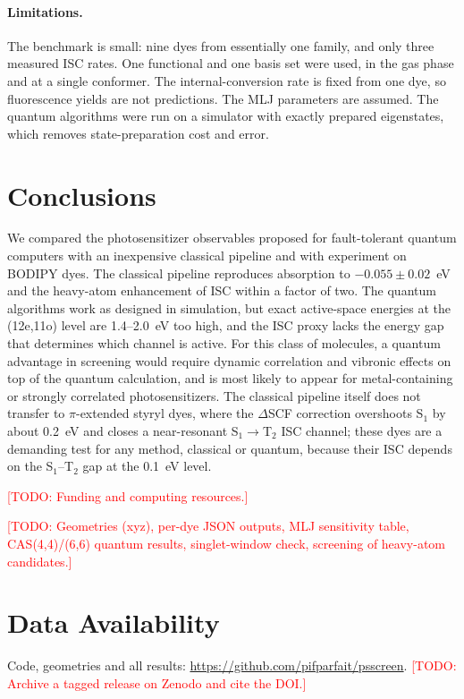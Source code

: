 \documentclass[journal=jpcafh,manuscript=article]{achemso}
\newcommand{\todo}[1]{\textcolor{red}{[TODO: #1]}}
\begin{document}
\paragraph{Limitations.} The benchmark is small: nine dyes from essentially one family, and only
three measured ISC rates. One functional and one basis set were used, in the gas phase and at a
single conformer. The internal-conversion rate is fixed from one dye, so fluorescence yields are not
predictions. The MLJ parameters are assumed. The quantum algorithms were run on a simulator with
exactly prepared eigenstates, which removes state-preparation cost and error.

\section{Conclusions}

We compared the photosensitizer observables proposed for fault-tolerant quantum computers with an
inexpensive classical pipeline and with experiment on BODIPY dyes. The classical pipeline reproduces
absorption to $-0.055\pm0.02$~eV and the heavy-atom enhancement of ISC within a factor of two. The
quantum algorithms work as designed in simulation, but exact active-space energies at the
(12e,11o) level are 1.4--2.0~eV too high, and the ISC proxy lacks the energy gap that determines
which channel is active. For this class of molecules, a quantum advantage in screening would require
dynamic correlation and vibronic effects on top of the quantum calculation, and is most likely to
appear for metal-containing or strongly correlated photosensitizers. The classical pipeline itself
does not transfer to $\pi$-extended styryl dyes, where the $\Delta$SCF correction overshoots S$_1$ by
about 0.2~eV and closes a near-resonant S$_1\to$T$_2$ ISC channel; these dyes are a demanding test for
any method, classical or quantum, because their ISC depends on the S$_1$--T$_2$ gap at the 0.1~eV
level.

\begin{acknowledgement}
\todo{Funding and computing resources.}
\end{acknowledgement}

\begin{suppinfo}
\todo{Geometries (xyz), per-dye JSON outputs, MLJ sensitivity table, CAS(4,4)/(6,6) quantum results,
singlet-window check, screening of heavy-atom candidates.}
\end{suppinfo}

\section*{Data Availability}
Code, geometries and all results: \url{https://github.com/pifparfait/psscreen}. \todo{Archive a
tagged release on Zenodo and cite the DOI.}


\end{document}
